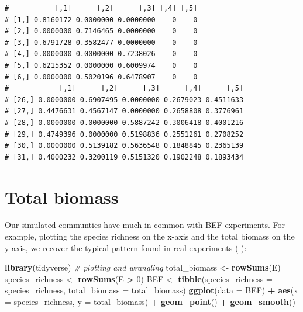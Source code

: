 \documentclass[
]{book}
\newenvironment{Shaded}{\begin{snugshade}}{\end{snugshade}}
\newcommand{\CommentTok}[1]{\textcolor[rgb]{0.56,0.35,0.01}{\textit{#1}}}
\newcommand{\DataTypeTok}[1]{\textcolor[rgb]{0.13,0.29,0.53}{#1}}
\newcommand{\DecValTok}[1]{\textcolor[rgb]{0.00,0.00,0.81}{#1}}
\newcommand{\KeywordTok}[1]{\textcolor[rgb]{0.13,0.29,0.53}{\textbf{#1}}}
\newcommand{\NormalTok}[1]{#1}
\newcommand{\OperatorTok}[1]{\textcolor[rgb]{0.81,0.36,0.00}{\textbf{#1}}}
\newcommand{\StringTok}[1]{\textcolor[rgb]{0.31,0.60,0.02}{#1}}
\begin{document}
\begin{verbatim}
#           [,1]      [,2]      [,3] [,4] [,5]
# [1,] 0.8160172 0.0000000 0.0000000    0    0
# [2,] 0.0000000 0.7146465 0.0000000    0    0
# [3,] 0.6791728 0.3582477 0.0000000    0    0
# [4,] 0.0000000 0.0000000 0.7238026    0    0
# [5,] 0.6215352 0.0000000 0.6009974    0    0
# [6,] 0.0000000 0.5020196 0.6478907    0    0
#            [,1]      [,2]      [,3]      [,4]      [,5]
# [26,] 0.0000000 0.6907495 0.0000000 0.2679023 0.4511633
# [27,] 0.4476631 0.4567147 0.0000000 0.2658808 0.3776961
# [28,] 0.0000000 0.0000000 0.5887242 0.3006418 0.4001216
# [29,] 0.4749396 0.0000000 0.5198836 0.2551261 0.2708252
# [30,] 0.0000000 0.5139182 0.5636548 0.1848845 0.2365139
# [31,] 0.4000232 0.3200119 0.5151320 0.1902248 0.1893434
\end{verbatim}

\hypertarget{total-biomass}{%
\section{Total biomass}\label{total-biomass}}

Our simulated communties have much in common with BEF experiments. For example, plotting the species richness on the x-axis and the total biomass on the y-axis, we recover the typical pattern found in real experiments (\citep{hector1999plant} \citep{tilman2001diversity} \citep{cadotte2013experimental}):

\begin{Shaded}
\begin{Highlighting}[]
\KeywordTok{library}\NormalTok{(tidyverse) }\CommentTok{# plotting and wrangling}
\NormalTok{total_biomass <-}\StringTok{ }\KeywordTok{rowSums}\NormalTok{(E)}
\NormalTok{species_richness <-}\StringTok{ }\KeywordTok{rowSums}\NormalTok{(E }\OperatorTok{>}\StringTok{ }\DecValTok{0}\NormalTok{)}
\NormalTok{BEF <-}\StringTok{ }\KeywordTok{tibble}\NormalTok{(}\DataTypeTok{species_richness =}\NormalTok{ species_richness, }\DataTypeTok{total_biomass =}\NormalTok{ total_biomass)}
\KeywordTok{ggplot}\NormalTok{(}\DataTypeTok{data =}\NormalTok{ BEF) }\OperatorTok{+}\StringTok{ }
\StringTok{  }\KeywordTok{aes}\NormalTok{(}\DataTypeTok{x =}\NormalTok{ species_richness, }\DataTypeTok{y =}\NormalTok{ total_biomass) }\OperatorTok{+}\StringTok{ }
\StringTok{  }\KeywordTok{geom_point}\NormalTok{() }\OperatorTok{+}\StringTok{ }\KeywordTok{geom_smooth}\NormalTok{()}
\end{Highlighting}
\end{Shaded}
\end{document}
